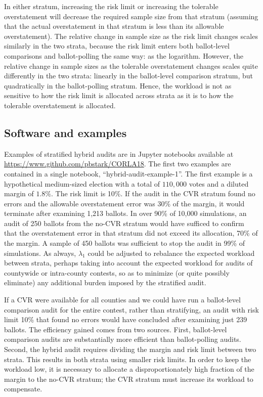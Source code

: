 \documentclass[12pt]{article}
\begin{document}
In either stratum, increasing the risk limit or increasing the tolerable overstatement will decrease
the required sample size from that stratum (assuming that the actual overstatement in
that stratum is less than its allowable overstatement).
The relative change in sample size as the risk limit changes scales similarly in the two strata, 
because the risk limit 
enters both ballot-level comparisons and ballot-polling the same way: as the logarithm.
However, the relative change in sample sizes as the tolerable overstatement changes
scales quite differently in the two strata: linearly in the ballot-level comparison stratum,
but quadratically in the ballot-polling stratum.
Hence, the workload is not as sensitive to how the risk limit is allocated across strata
as it is to how the tolerable overstatement is allocated.

\subsection{Software and examples}
Examples of stratified hybrid audits are in Jupyter notebooks available
at \url{https://www.github.com/pbstark/CORLA18}.
The first two examples are contained in a single notebook, ``hybrid-audit-example-1''.
The first example is a hypothetical medium-sized election with a total of 
$110,000$ votes and a diluted margin of $1.8\%$.  The risk limit is 10\%.
If the audit in the CVR stratum found no errors and the allowable overstatement error was 30\% of the margin, 
it would terminate after examining 1,213 ballots.
In over 90\% of 10,000 simulations, an audit of 250 ballots from the no-CVR stratum
would have sufficed to confirm that the overstatement error in that stratum
did not exceed its allocation, 70\% of the margin.
A sample of 450 ballots was sufficient to stop the audit in 99\% of simulations.
As always, $\lambda_1$ could be adjusted to
rebalance the expected workload between strata, perhaps taking into account the expected
workload for audits of countywide or intra-county contests, so as to minimize (or quite possibly
eliminate) any additional burden imposed by the stratified audit.

If a CVR were available for all counties and we could have run a ballot-level comparison audit for the entire contest, 
rather than stratifying, an audit with risk limit 10\% that found no errors would have concluded after examining just 239 ballots.
The efficiency gained comes from two sources.
First, ballot-level comparison audits are substantially more efficient than ballot-polling audits.
Second, the hybrid audit requires dividing the margin and risk limit between two strata.
This results in both strata using smaller risk limits.
In order to keep the workload low, it is necessary to allocate a disproportionately high fraction of the margin
to the no-CVR stratum;
the CVR stratum must increase its workload to compensate.
\end{document}
